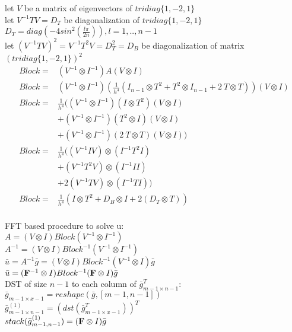 \documentclass[12pt,letter]{article}
\begin{document}
\begin{enumerate}
\begin{enumerate}
    let $V$ be a matrix of eigenvectors of $tridiag\{1,-2,1\}$\\
    let $V^{-1}TV=D_T$ be diagonalization of $tridiag\{1,-2,1\}$\\
    $D_T=diag(-4 sin^2(\frac{l \pi}{2n})), l = 1,..,n-1$\\
    let $(V^{-1}TV)^2=V^{-1}T^2 V=D_T^2=D_B$ be diagonalization of matrix $(tridiag\{1,-2,1\})^2$\\
    \begin{align*}
      Block=&(V^{-1} \otimes I^{-1})A(V \otimes I)\\
      Block=&(V^{-1} \otimes I^{-1})(\frac{1}{h^4}(I_{n-1} \otimes T^2 + T^2 \otimes I_{n-1}+2\ T \otimes T))(V \otimes I)\\    
      Block=&\frac{1}{h^4}((V^{-1} \otimes I^{-1})(I \otimes T^2)(V \otimes I)\\
      &+(V^{-1} \otimes I^{-1})(T^2 \otimes I)(V \otimes I)\\
      &+(V^{-1} \otimes I^{-1})(2\ T \otimes T)(V \otimes I))\\
      Block=&\frac{1}{h^4}((V^{-1}IV)\otimes(I^{-1}T^2I)\\
        &+(V^{-1}T^2V)\otimes(I^{-1}II)\\
        &+2(V^{-1}TV)\otimes(I^{-1}TI))\\
      Block=&\frac{1}{h^4}(I\otimes T^2 + D_B \otimes I +2(D_T \otimes T ))\\
    \end{align*}

    \pagebreak

    FFT based procedure to solve u:\\

    $A=(V \otimes I)Block(V^{-1} \otimes I^{-1})$\\
    $A^{-1}=(V \otimes I)Block^{-1}(V^{-1} \otimes I^{-1})$\\
    $\bar{u}=A^{-1}\bar{g}=(V \otimes I)Block^{-1}(V^{-1} \otimes I)\bar{g}$\\
    $\bar{u}=(\bold{F}^{-1} \otimes I)Block^{-1}(\bold{F} \otimes I)\bar{g}$\\

    DST of size $n-1$ to each column of $\bar{g}_{m-1 \times n-1}^T$:\\
    $\bar{g}_{m-1 \times x-1}=reshape(\bar{g},[m-1,n-1])$\\
    $\bar{g}_{m-1 \times n-1}^{(1)}= (dst(\bar{g}_{m-1 \times x-1}^T))^T$\\
    $stack(\bar{g}_{m-1,n-1}^{(1)}) = (\bold{F} \otimes I) \bar{g}$\\
    

\end{enumerate}
\end{enumerate}
\end{document}

